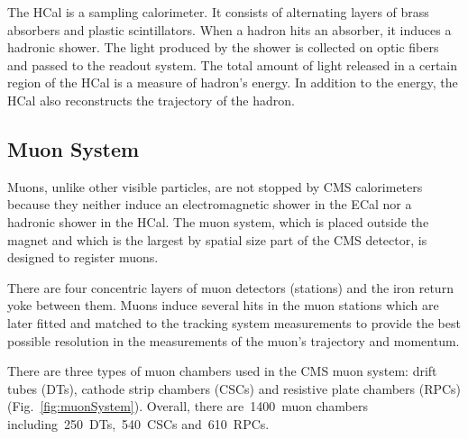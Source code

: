 The HCal is a sampling calorimeter. It consists of alternating layers of brass absorbers and plastic scintillators. When a hadron hits an absorber, it induces a hadronic shower. The light produced by the shower is collected on optic fibers and passed to the readout system. The total amount of light released in a certain region of the HCal is a measure of hadron's energy. In addition to the energy, the HCal also reconstructs the trajectory of the hadron.   

\subsection{Muon System}

Muons, unlike other visible particles, are not stopped by CMS calorimeters because they neither induce an electromagnetic shower in the ECal nor a hadronic shower in the HCal. The muon system, which is placed outside the magnet and which is the largest by spatial size part of the CMS detector, is designed to register muons.

There are four concentric layers of muon detectors (stations) and the iron return yoke between them. Muons induce several hits in the muon stations which are later fitted and matched to the tracking system measurements to provide the best possible resolution in the measurements of the muon's trajectory and momentum.

There are three types of muon chambers used in the CMS muon system: drift tubes (DTs), cathode strip chambers (CSCs) and resistive plate chambers (RPCs) (Fig.~\ref{fig:muonSystem}). Overall, there are~1400~muon chambers including~250~DTs,~540~CSCs and~610~RPCs.

